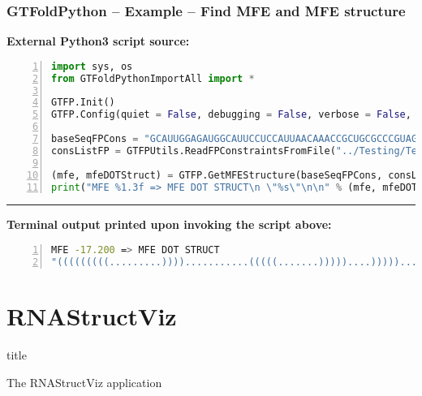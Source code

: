 \documentclass[usenames,svgnames,dvipsnames,11pt]{beamer}
\newcommand{\TitleBoxed}[1]{
     \begin{beamercolorbox}[sep=8pt,center,shadow=true,rounded=true]{title}
          \usebeamerfont{title}#1\par%
     \end{beamercolorbox}
}
\begin{document}
\begin{frame}[t,fragile]
\frametitle{GTFoldPython -- Example -- Find MFE and MFE structure}

\small\noindent
\textbf{External Python3 script source:}
\begin{lstlisting}[language=Python,basicstyle=\tiny\ttfamily,keywordstyle=\bfseries\color{green!40!black},
                   commentstyle=\itshape\color{purple!40!black},identifierstyle=\color{blue!63!green},
                   stringstyle=\color{orange},frame=none,keepspaces=true,numbers=left,xleftmargin=0.28cm]
import sys, os
from GTFoldPythonImportAll import *

GTFP.Init()
GTFP.Config(quiet = False, debugging = False, verbose = False, stdmsgout = "stderr")

baseSeqFPCons = "GCAUUGGAGAUGGCAUUCCUCCAUUAACAAACCGCUGCGCCCGUAGCAGCUGAUGAUGCCUACAGA"
consListFP = GTFPUtils.ReadFPConstraintsFromFile("../Testing/TestData/tRNA/yeast.fa.cons")

(mfe, mfeDOTStruct) = GTFP.GetMFEStructure(baseSeqFPCons, consListFP)
print("MFE %1.3f => MFE DOT STRUCT\n \"%s\"\n\n" % (mfe, mfeDOTStruct))
\end{lstlisting}

\medskip\hrule\medskip

\small\noindent
\textbf{Terminal output printed upon invoking the script above:}
\begin{lstlisting}[language=bash,basicstyle=\tiny\ttfamily,keywordstyle=\bfseries\color{green!40!black},
                   commentstyle=\itshape\color{purple!40!black},identifierstyle=\color{blue!63!green},
                   stringstyle=\color{orange},frame=none,keepspaces=true,numbers=left,xleftmargin=0.28cm]
MFE -17.200 => MFE DOT STRUCT 
"(((((((((.........))))...........(((((.......)))))....)))))......."
\end{lstlisting}

\end{frame}

\section{RNAStructViz}

\begin{frame}
\TitleBoxed{
     \Huge{\centerline{The RNAStructViz application}}
}
\end{frame}
\end{document}
